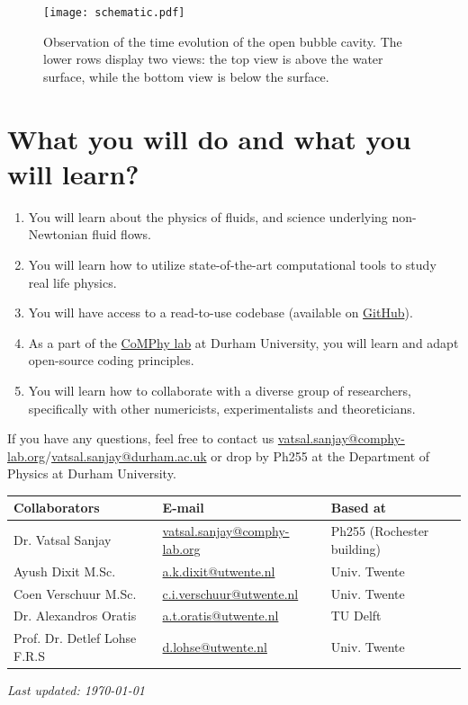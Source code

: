 \documentclass[11pt]{article}
\begin{document}
\begin{figure}[H]
\begin{center}
 \texttt{[image: schematic.pdf]}
 \caption{Observation of the time evolution of the open bubble cavity. The lower rows display two views: the top view is above the water surface, while the bottom view is below the surface. }
 \label{Figure::Waves}
\end{center}
\end{figure}
\section*{What you will do and what you will learn?}

\begin{enumerate}
\item You will learn about the physics of fluids, and science underlying non-Newtonian fluid flows. 
\item You will learn how to utilize state-of-the-art computational tools to study real life physics. 
\item You will have access to a read-to-use codebase (available on \href{https://github.com/comphy-lab/Viscoelastic-Worthington-jets-and-droplets-produced-by-bursting-bubbles}{GitHub}).
\item As a part of the \href{https://comphy-lab.org}{CoMPhy lab} at Durham University, you will learn and adapt open-source coding principles. 
\item You will learn how to collaborate with a diverse group of researchers, specifically with other numericists, experimentalists and theoreticians.

\end{enumerate}

\noindent If you have any questions, feel free to contact us \href{mailto:vatsal.sanjay@comphy-lab.org}{vatsal.sanjay@comphy-lab.org}/\href{mailto:vatsal.sanjay@durham.ac.uk}{vatsal.sanjay@durham.ac.uk} or drop by Ph255 at the Department of Physics at Durham University.

\begin{center}
\begin{tabular}{|l|l|l|}
\hline \textbf{Collaborators} & \textbf{E-mail} & \textbf{Based at} \\
\hline Dr. Vatsal Sanjay & \href{mailto:vatsal.sanjay@comphy-lab.org}{vatsal.sanjay@comphy-lab.org} & Ph255 (Rochester building) \\
\hline Ayush Dixit M.Sc. & \href{mailto:a.k.dixit@utwente.nl}{a.k.dixit@utwente.nl} & Univ. Twente \\
\hline Coen Verschuur M.Sc. & \href{mailto:c.i.verschuur@utwente.nl}{c.i.verschuur@utwente.nl} & Univ. Twente \\
\hline Dr. Alexandros Oratis   & \href{mailto:a.t.oratis@utwente.nl}{a.t.oratis@utwente.nl}& TU Delft \\
\hline Prof. Dr. Detlef Lohse F.R.S & \href{mailto:d.lohse@utwente.nl}{d.lohse@utwente.nl} & Univ. Twente  \\
\hline
\end{tabular}
\end{center}

\vspace{1em}
\noindent\textit{Last updated: \today}

\printbibliography
\end{document}
